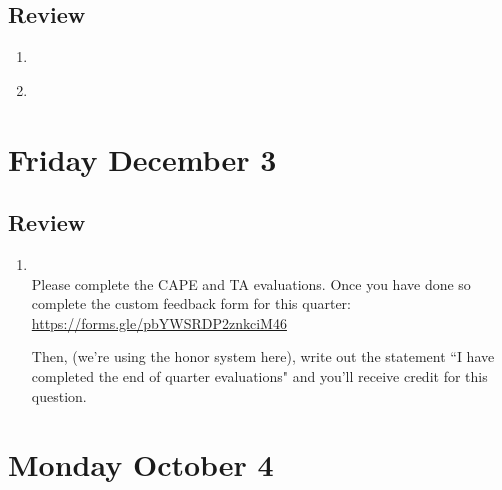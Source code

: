 \documentclass[12pt, oneside]{article}
\begin{document}
\subsection*{Review}
\begin{enumerate}
    \item \hspace{1in}\\ 
    \item \hspace{1in}\\  
\end{enumerate}

\newpage
\section*{Friday December 3}

\newpage

\newpage

\newpage

\newpage

\newpage

\newpage
\subsection*{Review}
\begin{enumerate}
    \item \hspace{1in}\\  Please complete the CAPE and TA evaluations.  Once 
    you have done so complete the custom feedback form for this quarter: 
    \url{https://forms.gle/pbYWSRDP2znkciM46}
    
    Then, (we're using the honor system here), write out the statement
    ``I have completed the end  of quarter evaluations"  and you'll receive credit 
    for  this  question.
\end{enumerate}


\section*{Monday October 4}





\end{document}
